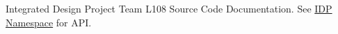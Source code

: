Integrated Design Project Team L108 Source Code Documentation. See \hyperlink{namespaceIDP}{IDP Namespace} for API. 